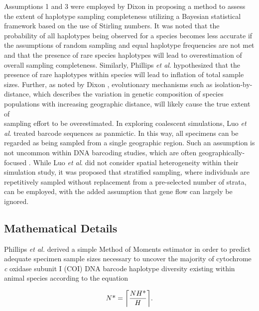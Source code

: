 Assumptions 1 and 3 were employed by Dixon \cite{dixon2006means} in proposing a method to assess the extent of haplotype sampling completeness utilizing a Bayesian statistical framework based on the use of Stirling numbers. It was noted that the probability of all haplotypes being observed for a species becomes less accurate if the assumptions of random sampling and equal haplotype frequencies are not met and that the presence of rare species haplotypes will lead to overestimation of overall sampling completeness. Similarly, Phillips \textit{et al}. \cite{phillips2015exploration} hypothesized that the presence of rare haplotypes within species will lead to inflation of total sample sizes. Further, as noted by Dixon \cite{dixon2006means}, evolutionary mechanisms such as isolation-by-distance, which describes the variation in genetic composition of species populations with increasing geographic distance, will likely cause the true extent of \\ sampling effort to be overestimated. In exploring coalescent simulations, Luo \textit{et al}. \cite{luo2015simulation} treated barcode sequences as panmictic. In this way, all specimens can be regarded as being sampled from a single geographic region. Such an assumption is not uncommon within DNA barcoding studies, which are often geographically-focused \cite{collins2013seven}. While Luo \textit{et al}. \cite{luo2015simulation} did not consider spatial heterogeneity within their simulation study, it was proposed that stratified sampling, where individuals are repetitively sampled without replacement from a pre-selected number of strata, can be employed, with the added assumption that gene flow can largely be ignored.

\vspace{5mm}

\subsection{Mathematical Details}

Phillips \textit{et al.} \cite{phillips2015exploration} derived a simple Method of Moments \cite{pearson1894contributions} estimator in order to predict adequate specimen sample sizes necessary to uncover the majority of cytochrome \textit{c} oxidase subunit I (COI) DNA barcode haplotype diversity existing within animal species according to the equation 

\begin{equation}
N\mbox{*} = \ceil*{\frac{NH\mbox{*}}{H}}.
\label{eqn}
\end{equation}


